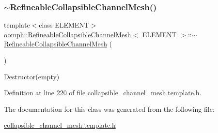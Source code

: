 \subsubsection{\texorpdfstring{$\sim$\+Refineable\+Collapsible\+Channel\+Mesh()}{~RefineableCollapsibleChannelMesh()}}
{\footnotesize\ttfamily template$<$class E\+L\+E\+M\+E\+NT$>$ \\
\hyperlink{classoomph_1_1RefineableCollapsibleChannelMesh}{oomph\+::\+Refineable\+Collapsible\+Channel\+Mesh}$<$ E\+L\+E\+M\+E\+NT $>$\+::$\sim$\hyperlink{classoomph_1_1RefineableCollapsibleChannelMesh}{Refineable\+Collapsible\+Channel\+Mesh} (\begin{DoxyParamCaption}{ }\end{DoxyParamCaption})\hspace{0.3cm}{\ttfamily [inline]}}



Destructor(empty) 



Definition at line 220 of file collapsible\+\_\+channel\+\_\+mesh.\+template.\+h.



The documentation for this class was generated from the following file\+:\begin{DoxyCompactItemize}
\item 
\hyperlink{collapsible__channel__mesh_8template_8h}{collapsible\+\_\+channel\+\_\+mesh.\+template.\+h}\end{DoxyCompactItemize}
